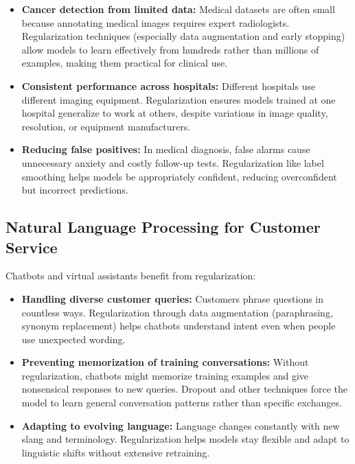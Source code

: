 \begin{itemize}
    \item \textbf{Cancer detection from limited data:} Medical datasets are often small because annotating medical images requires expert radiologists. Regularization techniques (especially data augmentation and early stopping) allow models to learn effectively from hundreds rather than millions of examples, making them practical for clinical use.
    
    \item \textbf{Consistent performance across hospitals:} Different hospitals use different imaging equipment. Regularization ensures models trained at one hospital generalize to work at others, despite variations in image quality, resolution, or equipment manufacturers.
    
    \item \textbf{Reducing false positives:} In medical diagnosis, false alarms cause unnecessary anxiety and costly follow-up tests. Regularization like label smoothing helps models be appropriately confident, reducing overconfident but incorrect predictions.
\end{itemize}

\subsection{Natural Language Processing for Customer Service}

Chatbots and virtual assistants benefit from regularization:

\begin{itemize}
    \item \textbf{Handling diverse customer queries:} Customers phrase questions in countless ways. Regularization through data augmentation (paraphrasing, synonym replacement) helps chatbots understand intent even when people use unexpected wording.
    
    \item \textbf{Preventing memorization of training conversations:} Without regularization, chatbots might memorize training examples and give nonsensical responses to new queries. Dropout and other techniques force the model to learn general conversation patterns rather than specific exchanges.
    
    \item \textbf{Adapting to evolving language:} Language changes constantly with new slang and terminology. Regularization helps models stay flexible and adapt to linguistic shifts without extensive retraining.
\end{itemize}

